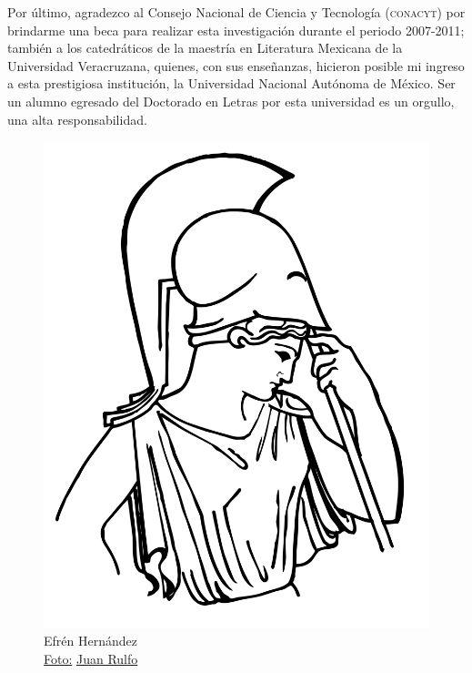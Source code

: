 \documentclass[14pt,twoside,final]{extbook} %
\begin{document}
Por último, agradezco al Consejo Nacional de Ciencia y Tecnología (\textsc{conacyt}) por brindarme una beca para realizar esta investigación durante el periodo 2007-2011; también a los catedráticos de la maestría en Literatura Mexicana de la Universidad Veracruzana, quienes, con sus enseñanzas, hicieron posible mi ingreso a esta prestigiosa institución, la Universidad Nacional Autónoma de México. Ser un alumno egresado del Doctorado en Letras por esta universidad es un orgullo, una alta responsabilidad.
\clearpage
\makeatletter
\renewcommand\@dotsep{200} %
\makeatother
\renewcommand{\contentsname}{Índice}
\thispagestyle{empty}
\pagestyle{fancy}
\fancyhf{} %
\fancyhead[RO,LE]{\thepage}
\fancyfoot{}
\renewcommand{\headrulewidth}{0pt}
\setcounter{page}{7}
\tableofcontents
\newpage
\pagestyle{empty}
\null\vfill
\newpage
\pagestyle{empty}
\hspace*{0pt}
\vfill
\begin{figure}[H]
\centering
\includegraphics[width=\textwidth]{02}
\vspace{2pt} \\
Efrén Hernández
\vspace*{14pt} \\

\href{https://queridobartleby.es/wp-content/uploads/2021/05/Efren-Hernandez.jpg}{Foto:} \href{Tomada del blog: https://queridobartleby.es/}{Juan Rulfo\textcopyright}
\end{figure}
\end{document}
